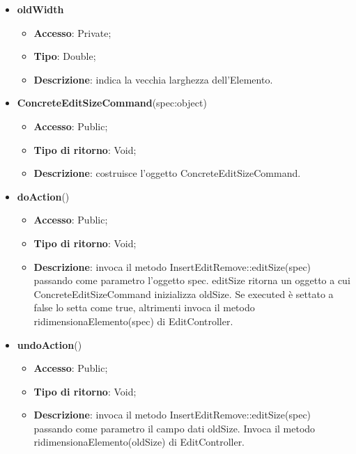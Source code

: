 {{{\begin{itemize}
\begin{itemize}
\begin{itemize}
\begin{itemize}
				\end{itemize}
				\item \textbf{oldWidth}
				\begin{itemize}
					\item \textbf{Accesso}: Private;
					\item \textbf{Tipo}: Double;
					\item \textbf{Descrizione}: indica la vecchia larghezza dell’Elemento.
				\end{itemize}
			\end{itemize}
				\end{itemize}
				\end{itemize}
			\begin{itemize}
				\item \textbf{ConcreteEditSizeCommand}(spec:object)
				\begin{itemize}
					\item \textbf{Accesso}: Public;
					\item \textbf{Tipo di ritorno}: Void;
					\item \textbf{Descrizione}: costruisce l’oggetto ConcreteEditSizeCommand.
				\end{itemize}
				\item \textbf{doAction}()
				\begin{itemize}
					\item \textbf{Accesso}: Public;
					\item \textbf{Tipo di ritorno}: Void;
					\item \textbf{Descrizione}: invoca il metodo InsertEditRemove::editSize(spec) passando come parametro l'oggetto spec. editSize ritorna un oggetto a cui ConcreteEditSizeCommand inizializza oldSize. Se executed è settato a false lo setta come true, altrimenti invoca il metodo ridimensionaElemento(spec) di EditController.
				\end{itemize}
				\item \textbf{undoAction}()
				\begin{itemize}
					\item \textbf{Accesso}: Public;
					\item \textbf{Tipo di ritorno}: Void;
					\item \textbf{Descrizione}: invoca il metodo InsertEditRemove::editSize(spec) passando come parametro il campo dati oldSize. Invoca il metodo ridimensionaElemento(oldSize) di EditController.
				\end{itemize}
			\end{itemize}
			}

}}
